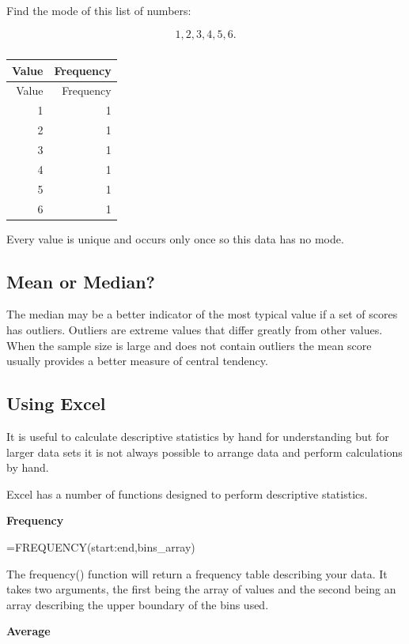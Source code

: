 \documentclass[
]{book}
\begin{document}
Find the mode of this list of numbers:

\[ 1, 2, 3, 4, 5, 6.\]

\begin{longtable}[]{@{}rr@{}}
\caption{\label{tab:table4}}\tabularnewline
\toprule
Value & Frequency \\
\midrule
\endfirsthead
\toprule
Value & Frequency \\
\midrule
\endhead
1 & 1 \\
2 & 1 \\
3 & 1 \\
4 & 1 \\
5 & 1 \\
6 & 1 \\
\bottomrule
\end{longtable}

Every value is unique and occurs only once so this data has no mode.

\hypertarget{mean-or-median}{%
\subsection{Mean or Median?}\label{mean-or-median}}

The median may be a better indicator of the most typical value if a set of scores has outliers. Outliers are extreme values that differ greatly from other values. When the sample size is large and does not contain outliers the mean score usually provides a better measure of central tendency.

\hypertarget{using-excel}{%
\subsection{Using Excel}\label{using-excel}}

It is useful to calculate descriptive statistics by hand for understanding but for larger data sets it is not always possible to arrange data and perform calculations by hand.

Excel has a number of functions designed to perform descriptive statistics.

\textbf{Frequency}

=FREQUENCY(start:end,bins\_array)

The frequency() function will return a frequency table describing your data. It takes two arguments, the first being the array of values and the second being an array describing the upper boundary of the bins used.

\textbf{Average}
\end{document}

